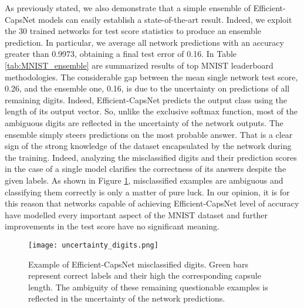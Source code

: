 \documentclass{article}
\begin{document}
As previously stated, we also demonstrate that a simple ensemble of Efficient-CapsNet models can easily establish a state-of-the-art result. Indeed, we exploit the 30 trained networks for test score statistics to produce an ensemble prediction. In particular, we average all network predictions with an accuracy greater than 0.9973, obtaining a final test error of 0.16. In Table \ref{tab:MNIST_ensemble} are summarized results of top MNIST leaderboard methodologies. The considerable gap between the mean single network test score, 0.26, and the ensemble one, 0.16, is due to the uncertainty on predictions of all remaining digits. Indeed, Efficient-CapsNet predicts the output class using the length of its output vector. So, unlike the exclusive softmax function, most of the ambiguous digits are reflected in the uncertainty of the network outputs. The ensemble simply steers predictions on the most probable answer. That is a clear sign of the strong knowledge of the dataset encapsulated by the network during the training. Indeed, analyzing the misclassified digits and their prediction scores in the case of a single model clarifies the correctness of its answers despite the given labels. As shown in Figure \ref{fig:uncertainty_digits}, misclassified examples are ambiguous and classifying them correctly is only a matter of pure luck. In our opinion, it is for this reason that networks capable of achieving Efficient-CapsNet level of accuracy have modelled every important aspect of the MNIST dataset and further improvements in the test score have no significant meaning. 


\begin{figure}[b]
    \centering
    \texttt{[image: uncertainty\_digits.png]}
    \caption{Example of Efficient-CapsNet misclassified digits. Green bars represent correct labels and their high the corresponding capsule length. The ambiguity of these remaining questionable examples is reflected in the uncertainty of the network predictions.}
    \label{fig:uncertainty_digits}
\end{figure}
\end{document}
